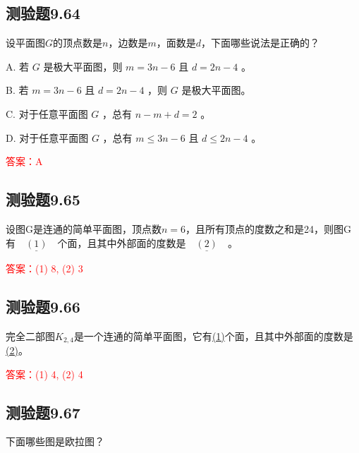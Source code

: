 \documentclass[UTF8, heading=true]{ctexart}
\begin{document}
\subsection{测验题9.64}

设平面图$G$的顶点数是$n$，边数是$m$，面数是$d$，下面哪些说法是正确的？

A. 若 $G$ 是极大平面图，则 $m=3 n-6$ 且 $d=2 n-4$ 。

B. 若 $m=3 n-6$ 且 $d=2 n-4$ ，则 $G$ 是极大平面图。

C. 对于任意平面图 $G$ ，总有 $n-m+d=2$ 。

D. 对于任意平面图 $G$ ，总有 $m \leq 3 n-6$ 且 $d \leq 2 n-4$ 。

\textcolor{red}{答案：A}

\subsection{测验题9.65}

设图G是连通的简单平面图，顶点数$n = 6$，且所有顶点的度数之和是24，则图G有$\underline{\quad (1) \quad }$个面，且其中外部面的度数是$\underline{\quad (2) \quad }$。

\textcolor{red}{答案：(1) 8, (2) 3}

\subsection{测验题9.66}

完全二部图$K_{2,4}$是一个连通的简单平面图，它有\underline{\quad (1)\quad}个面，且其中外部面的度数是\underline{\quad (2)\quad}。

\textcolor{red}{答案：(1) 4, (2) 4}

\subsection{测验题9.67}

下面哪些图是欧拉图？
\end{document}

